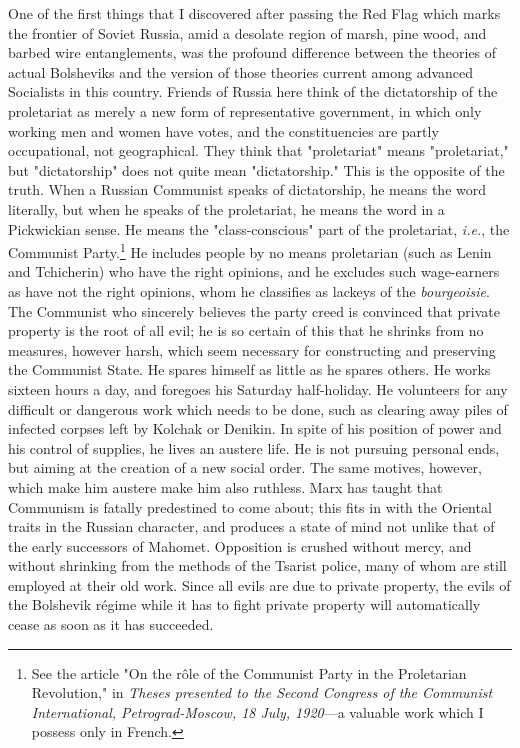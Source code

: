 One of the first things that I discovered after passing the Red Flag which marks the frontier of Soviet Russia, amid a desolate region of marsh, pine wood, and barbed wire entanglements, was the profound difference between the theories of actual Bolsheviks and the version of those theories current among advanced Socialists in this country. Friends of Russia here think of the dictatorship of the proletariat as merely a new form of representative government, in which only working men and women have votes, and the constituencies are partly occupational, not geographical. They think that "proletariat" means "proletariat," but "dictatorship" does not quite mean "dictatorship." This is the opposite of the truth. When a Russian Communist speaks of dictatorship, he means the word literally, but when he speaks of the proletariat, he means the word in a Pickwickian sense. He means the "class-conscious" part of the proletariat, \emph{i.e.}, the Communist Party.\footnote{See the article "On the rôle of the Communist Party in the Proletarian Revolution," in \emph{Theses presented to the Second Congress of the Communist International, Petrograd-Moscow, 18 July, 1920}---a valuable work which I possess only in French.} He includes people by no means proletarian (such as Lenin and Tchicherin) who have the right opinions, and he excludes such wage-earners as have not the right opinions, whom he classifies as lackeys of the \emph{bourgeoisie}. The Communist who sincerely believes the party creed is convinced that private property is the root of all evil; he is so certain of this that he shrinks from no measures, however harsh, which seem necessary for constructing and preserving the Communist State. He spares himself as little as he spares others. He works sixteen hours a day, and foregoes his Saturday half-holiday. He volunteers for any difficult or dangerous work which needs to be done, such as clearing away piles of infected corpses left by Kolchak or Denikin. In spite of his position of power and his control of supplies, he lives an austere life. He is not pursuing personal ends, but aiming at the creation of a new social order. The same motives, however, which make him austere make him also ruthless. Marx has taught that Communism is fatally predestined to come about; this fits in with the Oriental traits in the Russian character, and produces a state of mind not unlike that of the early successors of Mahomet. Opposition is crushed without mercy, and without shrinking from the methods of the Tsarist police, many of whom are still employed at their old work. Since all evils are due to private property, the evils of the Bolshevik régime while it has to fight private property will automatically cease as soon as it has succeeded.

